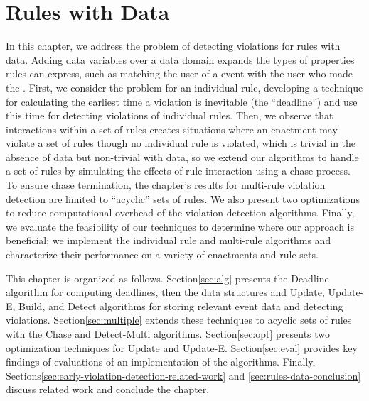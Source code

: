 \chapter{Rules with Data}
\label{chapter:early-violation-detection}
  
In this chapter, we address the problem of
detecting violations for rules with data.
Adding data variables over a data domain
expands the types of properties rules can express,
such as matching the user of a {\Payment} event
with the user who made the {\Request}.
First,
we consider the problem for an individual rule,
developing a technique for calculating the earliest time
a violation is inevitable (the ``deadline'')
and use this time for detecting violations of individual rules.
Then,
we observe that 
interactions within a set of rules
creates situations where
an enactment may violate a set of rules
though no individual rule is violated,
which is trivial in the absence of data
but non-trivial with data,
so we extend our algorithms to handle a set of rules
by simulating the effects of rule interaction using a chase process.
To ensure chase termination,
the chapter's results for multi-rule violation detection
are limited to ``acyclic'' sets of rules.
We also present two optimizations
to reduce computational overhead
of the violation detection algorithms.
Finally,
we evaluate the feasibility of our techniques
to determine where our approach is beneficial;
we implement the individual rule and multi-rule algorithms and
characterize their performance on a variety of enactments and rule sets.

This chapter is organized as follows.
Section\:\ref{sec:alg}
presents the {\sf Deadline} algorithm for computing deadlines,
then the data structures and 
{\sf Update}, {\sf Update-E}, {\sf Build}, and {\sf Detect} algorithms
for storing relevant event data
and detecting violations.
Section\:\ref{sec:multiple}
extends these techniques to 
acyclic sets of rules
with the {\sf Chase} and {\sf Detect-Multi} algorithms.
Section\:\ref{sec:opt}
presents two optimization techniques
for {\sf Update} and {\sf Update-E}.
Section\:\ref{sec:eval}
provides key findings of evaluations
of an implementation of the algorithms.
Finally,
Sections\:\ref{sec:early-violation-detection-related-work} and \ref{sec:rules-data-conclusion}
discuss related work and conclude the chapter.

